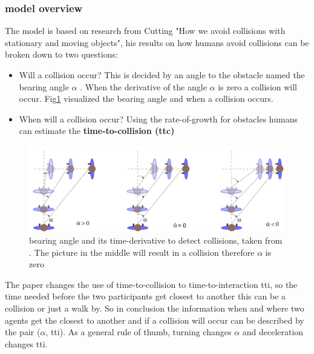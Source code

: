 \documentclass{acmsiggraph}               %
\begin{document}
\subsubsection{model overview}

The model is based on research from Cutting "How we avoid collisions with stationary and moving objects", his results on how humans avoid collisions can be broken down to two questions: 
\begin{itemize}
\item Will a collision occur? This is decided by an angle to the obstacle named the bearing angle $\alpha$ . When the derivative of the angle \textbf{\.{$\alpha$}} is zero a collision will occur. Fig\ref{fig:visualBearingangle} visualized the bearing angle and when a collision occurs.
\item When will a collision occur? Using the rate-of-growth for obstacles humans can estimate the \textbf{time-to-collision (ttc)}
\end{itemize}
\begin{figure}[h]
  \centering
  \includegraphics[width=1\linewidth]{images/visualApproach-bearingAngle.png}
  \caption{bearing angle and its time-derivative to detect collisions, taken from \protect\cite{ondrej_synthetic-vision_2010}. The picture in the middle will result in a collision therefore \.{$\alpha$} is zero}
  \label{fig:visualBearingangle}
\end{figure}
The paper changes the use of time-to-collision to time-to-interaction tti, so the time needed before the two participants get closest to another this can be a collision or just a walk by. So in conclusion the information when and where two agents get the closest to another and if a collision will occur can be described by the pair (\.{$\alpha$}, tti). As a general rule of thumb, turning changes \.{$\alpha$} and deceleration changes tti. 
\end{document}
